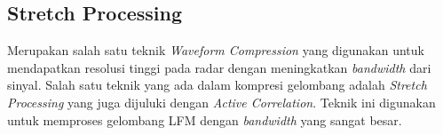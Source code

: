 \subsection{Stretch Processing}
Merupakan salah satu teknik \textit{Waveform Compression} yang digunakan untuk mendapatkan resolusi tinggi pada radar dengan meningkatkan \textit{bandwidth} dari sinyal. Salah satu teknik yang ada dalam kompresi gelombang adalah \textit{Stretch Processing} yang juga dijuluki dengan \textit{Active Correlation}. Teknik ini digunakan untuk memproses gelombang LFM dengan \textit{bandwidth} yang sangat besar.

